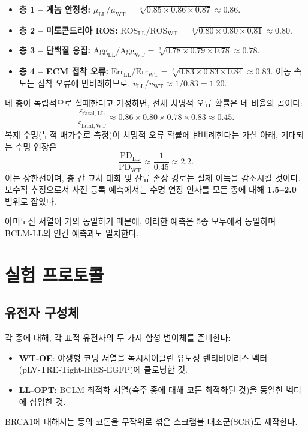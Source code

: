 \documentclass[12pt,a4paper]{article}
\begin{document}
	\begin{itemize}
		\item \textbf{층 1 – 게놈 안정성:} \(\mu_{\mathrm{LL}}/\mu_{\mathrm{WT}} = \sqrt[3]{0.85\times0.86\times0.87} \approx 0.86\).
		\item \textbf{층 2 – 미토콘드리아 ROS:} \(\mathrm{ROS}_{\mathrm{LL}}/\mathrm{ROS}_{\mathrm{WT}} = \sqrt[3]{0.80\times0.80\times0.81} \approx 0.80\).
		\item \textbf{층 3 – 단백질 응집:} \(\mathrm{Agg}_{\mathrm{LL}}/\mathrm{Agg}_{\mathrm{WT}} = \sqrt[3]{0.78\times0.79\times0.78} \approx 0.78\).
		\item \textbf{층 4 – ECM 접착 오류:} \(\mathrm{Err}_{\mathrm{LL}}/\mathrm{Err}_{\mathrm{WT}} = \sqrt[3]{0.83\times0.83\times0.84} \approx 0.83\). 이동 속도는 접착 오류에 반비례하므로, \(v_{\mathrm{LL}}/v_{\mathrm{WT}} \approx 1/0.83 = 1.20\).
	\end{itemize}
	
	네 층이 독립적으로 실패한다고 가정하면, 전체 치명적 오류 확률은 네 비율의 곱이다:
	\[
	\frac{\varepsilon_{\mathrm{fatal,LL}}}{\varepsilon_{\mathrm{fatal,WT}}} \approx 0.86 \times 0.80 \times 0.78 \times 0.83 \approx 0.45.
	\]
	복제 수명(누적 배가수로 측정)이 치명적 오류 확률에 반비례한다는 가설 아래, 기대되는 수명 연장은
	\[
	\frac{\mathrm{PD}_{\mathrm{LL}}}{\mathrm{PD}_{\mathrm{WT}}} \approx \frac{1}{0.45} \approx 2.2.
	\]
	이는 상한선이며, 층 간 교차 대화 및 잔류 손상 경로는 실제 이득을 감소시킬 것이다. 보수적 추정으로서 사전 등록 예측에서는 수명 연장 인자를 모든 종에 대해 \textbf{1.5–2.0} 범위로 잡았다.
	
	아미노산 서열이 거의 동일하기 때문에, 이러한 예측은 5종 모두에서 동일하며 BCLM‑LL의 인간 예측과도 일치한다.
	
	\section{실험 프로토콜}
	\label{sec:protocol}
	
	\subsection{유전자 구성체}
	각 종에 대해, 각 표적 유전자의 두 가지 합성 변이체를 준비한다:
	\begin{itemize}
		\item \textbf{WT‑OE}: 야생형 코딩 서열을 독시사이클린 유도성 렌티바이러스 벡터(pLV‑TRE‑Tight‑IRES‑EGFP)에 클로닝한 것.
		\item \textbf{LL‑OPT}: BCLM 최적화 서열(숙주 종에 대해 코돈 최적화된 것)을 동일한 벡터에 삽입한 것.
	\end{itemize}
	BRCA1에 대해서는 동의 코돈을 무작위로 섞은 스크램블 대조군(SCR)도 제작한다.
	
\end{document}
